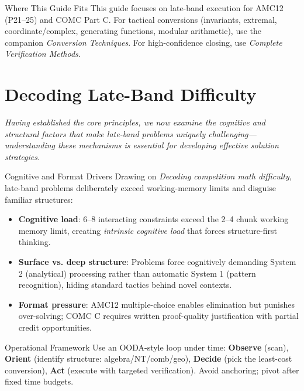 \documentclass{article}
\begin{document}
\begin{contextbox}{Where This Guide Fits}
This guide focuses on late-band execution for AMC12 (P21--25) and COMC Part C. For tactical conversions (invariants, extremal, coordinate/complex, generating functions, modular arithmetic), use the companion \emph{Conversion Techniques}. For high-confidence closing, use \emph{Complete Verification Methods}.
\end{contextbox}

\newpage

\section{Decoding Late-Band Difficulty}

\textit{Having established the core principles, we now examine the cognitive and structural factors that make late-band problems uniquely challenging---understanding these mechanisms is essential for developing effective solution strategies.}

\begin{contextbox}{Cognitive and Format Drivers}
Drawing on \emph{Decoding competition math difficulty}, late-band problems deliberately exceed working-memory limits and disguise familiar structures:
\begin{itemize}
    \item \textbf{Cognitive load}: 6--8 interacting constraints exceed the 2--4 chunk working memory limit, creating \emph{intrinsic cognitive load} that forces structure-first thinking.
    \item \textbf{Surface vs. deep structure}: Problems force cognitively demanding System 2 (analytical) processing rather than automatic System 1 (pattern recognition), hiding standard tactics behind novel contexts.
    \item \textbf{Format pressure}: AMC12 multiple-choice enables elimination but punishes over-solving; COMC C requires written proof-quality justification with partial credit opportunities.
\end{itemize}
\end{contextbox}

\begin{strategybox}{Operational Framework}
Use an OODA-style loop under time: \textbf{Observe} (scan), \textbf{Orient} (identify structure: algebra/NT/comb/geo), \textbf{Decide} (pick the least-cost conversion), \textbf{Act} (execute with targeted verification). Avoid anchoring; pivot after fixed time budgets.
\end{strategybox}
\end{document}

